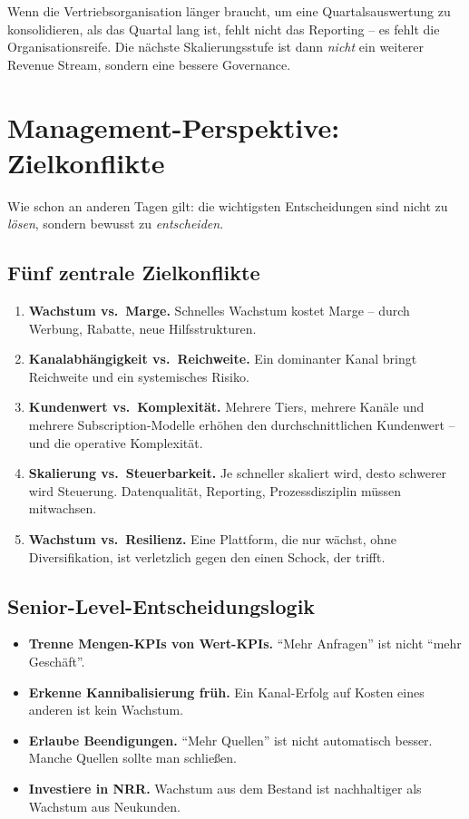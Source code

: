 \documentclass[11pt,a4paper,oneside]{article}
\begin{document}
\begin{merkbox}
Wenn die Vertriebsorganisation länger braucht, um eine Quartalsauswertung zu konsolidieren, als das Quartal lang ist, fehlt nicht das Reporting -- es fehlt die Organisationsreife. Die nächste Skalierungsstufe ist dann \emph{nicht} ein weiterer Revenue Stream, sondern eine bessere Governance.
\end{merkbox}

\section{Management-Perspektive: Zielkonflikte}

Wie schon an anderen Tagen gilt: die wichtigsten Entscheidungen sind nicht zu \emph{lösen}, sondern bewusst zu \emph{entscheiden}.

\subsection{Fünf zentrale Zielkonflikte}

\begin{enumerate}
  \item \textbf{Wachstum vs.\ Marge.} Schnelles Wachstum kostet Marge -- durch Werbung, Rabatte, neue Hilfsstrukturen.
  \item \textbf{Kanalabhängigkeit vs.\ Reichweite.} Ein dominanter Kanal bringt Reichweite und ein systemisches Risiko.
  \item \textbf{Kundenwert vs.\ Komplexität.} Mehrere Tiers, mehrere Kanäle und mehrere Subscription-Modelle erhöhen den durchschnittlichen Kundenwert -- und die operative Komplexität.
  \item \textbf{Skalierung vs.\ Steuerbarkeit.} Je schneller skaliert wird, desto schwerer wird Steuerung. Datenqualität, Reporting, Prozessdisziplin müssen mitwachsen.
  \item \textbf{Wachstum vs.\ Resilienz.} Eine Plattform, die nur wächst, ohne Diversifikation, ist verletzlich gegen den einen Schock, der trifft.
\end{enumerate}

\subsection{Senior-Level-Entscheidungslogik}

\begin{itemize}
  \item \textbf{Trenne Mengen-KPIs von Wert-KPIs.} ``Mehr Anfragen'' ist nicht ``mehr Geschäft''.
  \item \textbf{Erkenne Kannibalisierung früh.} Ein Kanal-Erfolg auf Kosten eines anderen ist kein Wachstum.
  \item \textbf{Erlaube Beendigungen.} ``Mehr Quellen'' ist nicht automatisch besser. Manche Quellen sollte man schließen.
  \item \textbf{Investiere in NRR.} Wachstum aus dem Bestand ist nachhaltiger als Wachstum aus Neukunden.
\end{itemize}
\end{document}
